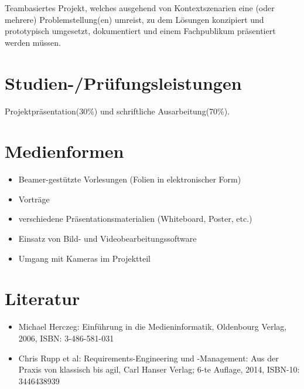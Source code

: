 Teambasiertes Projekt, welches ausgehend von Kontextszenarien eine (oder
mehrere) Problemstellung(en) umreist, zu dem Lösungen konzipiert und
prototypisch umgesetzt, dokumentiert und einem Fachpublikum präsentiert
werden müssen.

\section*{Studien-/Prüfungsleistungen\label{/mi-2017/modulbeschreibungen-bachelor/BA_EinfhrungindieMedieninformatik}}\label{studien-pruxfcfungsleistungenpathlabelmi-2017modulbeschreibungen-bachelorbaux5feinfhrungindiemedieninformatik}

Projektpräsentation(30\%) und schriftliche Ausarbeitung(70\%).

\section*{Medienformen\label{/mi-2017/modulbeschreibungen-bachelor/BA_EinfhrungindieMedieninformatik}}\label{medienformenpathlabelmi-2017modulbeschreibungen-bachelorbaux5feinfhrungindiemedieninformatik}

\begin{itemize}
\tightlist
\item
  Beamer-gestützte Vorlesungen (Folien in elektronischer Form)
\item
  Vorträge
\item
  verschiedene Präsentationsmaterialien (Whiteboard, Poster, etc.)
\item
  Einsatz von Bild- und Videobearbeitungssoftware
\item
  Umgang mit Kameras im Projektteil
\end{itemize}

\section*{Literatur\label{/mi-2017/modulbeschreibungen-bachelor/BA_EinfhrungindieMedieninformatik}}\label{literaturpathlabelmi-2017modulbeschreibungen-bachelorbaux5feinfhrungindiemedieninformatik}

\begin{itemize}
\tightlist
\item
  Michael Herczeg: Einführung in die Medieninformatik, Oldenbourg
  Verlag, 2006, ISBN: 3-486-581-031
\item
  Chris Rupp et al: Requirements-Engineering und -Management: Aus der
  Praxis von klassisch bis agil, Carl Hanser Verlag; 6-te Auflage, 2014,
  ISBN-10: 3446438939
\end{itemize}

